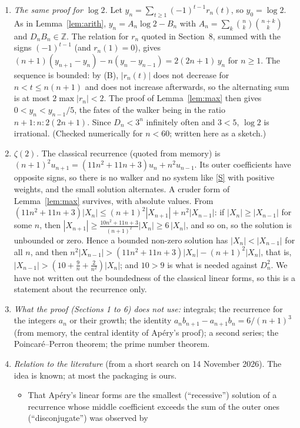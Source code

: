 \documentclass[11pt]{article}
\newcommand{\Z}{\mathbb Z}
\begin{document}
\begin{enumerate}
\item \emph{The same proof for $\log2$.} Let $y_n=\sum_{t\ge1}(-1)^{t-1}r_n(t)$, so
$y_0=\log2$. As in Lemma~\ref{lem:arith}, $y_n=A_n\log2-B_n$ with
$A_n=\sum_k\binom nk\binom{n+k}k$ and $D_nB_n\in\Z$. The relation for $r_n$ quoted in Section~8,
summed with the signs $(-1)^{t-1}$ (and $r_n(1)=0$), gives
$(n+1)(y_{n+1}-y_n)-n(y_n-y_{n-1})=2(2n+1)\,y_n$ for $n\ge1$. The sequence is bounded: by (B),
$|r_n(t)|$ does not decrease for $n<t\le n(n+1)$ and does not increase afterwards, so the alternating sum is at
most $2\max|r_n|<2$. The proof of Lemma~\ref{lem:max} then gives $0<y_n<y_{n-1}/5$, the fates of
the walker being in the ratio $n+1:n:2(2n+1)$. Since $D_n<3^n$ infinitely often and $3<5$, $\log2$
is irrational. (Checked numerically for $n<60$; written here as a sketch.)
\item \emph{$\zeta(2)$.} The classical recurrence (quoted from memory) is $(n+1)^2u_{n+1}=(11n^2+11n+3)u_n+n^2u_{n-1}$.
Its outer coefficients have opposite signs, so there is no walker and no system like \eqref{S}
with positive weights, and the small solution alternates. A cruder form of Lemma~\ref{lem:max}
survives, with absolute values. From
$(11n^2+11n+3)|X_n|\le(n+1)^2|X_{n+1}|+n^2|X_{n-1}|$: if $|X_n|\ge|X_{n-1}|$ for some $n$, then
$|X_{n+1}|\ge\frac{10n^2+11n+3}{(n+1)^2}|X_n|\ge6\,|X_n|$, and so on, so the solution is unbounded or
zero. Hence a bounded non-zero solution has $|X_n|<|X_{n-1}|$ for all $n$, and then
$n^2|X_{n-1}|>(11n^2+11n+3)|X_n|-(n+1)^2|X_n|$, that is, $|X_{n-1}|>(10+\frac9n+\frac2{n^2})|X_n|$;
and $10>9$ is what is needed against $D_n^2$. We have not written out the boundedness of the
classical linear forms, so this is a statement about the recurrence only.
\item \emph{What the proof (Sections 1 to 6) does not use:} integrals; the recurrence for the
integers $a_n$ or their growth; the identity $a_nb_{n+1}-a_{n+1}b_n=6/(n+1)^3$ (from memory, the
central identity of Ap\'ery's proof); a second series; the Poincar\'e--Perron theorem; the prime
number theorem.
\item \emph{Relation to the literature} (from a short search on 14 November 2026). The idea is
known; at most the packaging is ours.
\begin{itemize}
\item That Ap\'ery's linear forms are the smallest (``recessive'') solution of a recurrence whose
middle coefficient exceeds the sum of the outer ones (``disconjugate'') was observed by

\end{itemize}
\end{enumerate}
\end{document}

